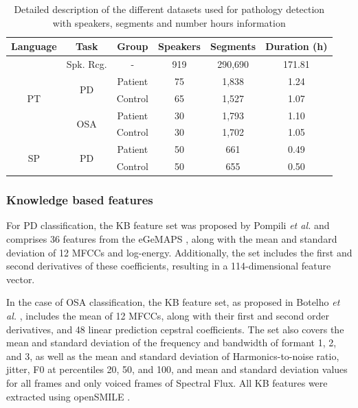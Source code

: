 \begin{table}[h]
  \centering
  \begin{tabular}{cccccc}
  \hline
  Language & Task & Group & Speakers & Segments & Duration (h) \\
    \hline
  \multirow{5}{*}{PT} & Spk. Rcg. & - & 919 & 290,690 & 171.81  \\ \cline{2-6}
  & \multirow{2}{*}{PD} & Patient & 75 & 1,838 & 1.24 \\
  & & Control & 65 & 1,527 & 1.07 \\ \cline{2-6}
  & \multirow{2}{*}{OSA} & Patient & 30 & 1,793 & 1.10 \\
  &  & Control & 30 & 1,702 & 1.05 \\
  \hline
  \multirow{2}{*}{SP} & \multirow{2}{*}{PD} & Patient & 50 & 661 & 0.49 \\
  & & Control & 50 & 655 & 0.50 \\

  \hline
  \end{tabular}
  \caption{Detailed description of the different datasets used for pathology detection with speakers, segments and number hours information}
  \label{tab:xvect_data}
  \end{table}
  

\subsubsection{Knowledge based features}
For \ac{PD} classification, the \ac{KB} feature set was proposed by Pompili \textit{et al.} \cite{pompili2017automatic} and comprises 36 features from the eGeMAPS \cite{eyben2015geneva}, along with the mean and standard deviation of 12 \acp{MFCC} and log-energy. Additionally, the set includes the first and second derivatives of these coefficients, resulting in a 114-dimensional feature vector.

In the case of \ac{OSA} classification, the \ac{KB} feature set, as proposed in Botelho \textit{et al.} \cite{botelho2019speech}, includes the mean of 12 \acp{MFCC}, along with their first and second order derivatives, and 48 linear prediction cepstral coefficients. The set also covers the mean and standard deviation of the frequency and bandwidth of formant 1, 2, and 3, as well as the mean and standard deviation  of Harmonics-to-noise ratio, jitter, F0 at percentiles 20, 50, and 100, and mean and standard deviation  values for all frames and only voiced frames of Spectral Flux. All \ac{KB} features were extracted using openSMILE \cite{eyben2013recent}.

